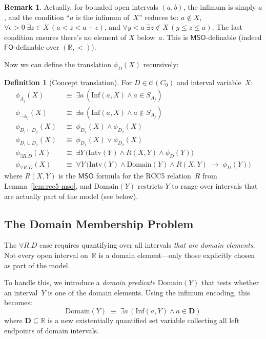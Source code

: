 \documentclass[a4paper,11pt]{article}
\theoremstyle{definition}
\newtheorem{definition}[theorem]{Definition}
\newtheorem{remark}[theorem]{Remark}
\newcommand{\cl}{\ensuremath{\mathsf{cl}}}
\newcommand{\MSO}{\ensuremath{\mathsf{MSO}}}
\newcommand{\FO}{\ensuremath{\mathsf{FO}}}
\newcommand{\reals}{\ensuremath{\mathbb{R}}}
\begin{document}
\begin{remark}
Actually, for bounded open intervals $(a,b)$, the infimum is simply
$a$, and the condition ``$a$ is the infimum of~$X$'' reduces to:
$a \notin X$, $\forall \epsilon > 0 \;\exists z \in X\,(a < z < a+\epsilon)$,
and $\forall y < a\;\exists z \notin X\,(y \leq z \leq a)$.
The last condition ensures there's no element of $X$ below~$a$.
This is $\MSO$-definable (indeed $\FO$-definable over $(\reals, <)$).
\end{remark}

Now we can define the translation $\phi_D(X)$ recursively:

\begin{definition}[Concept translation]
\label{def:translation}
For $D \in \cl(C_0)$ and interval variable~$X$:
\begin{align*}
  \phi_{A_j}(X) &\;\equiv\; \exists a\,(\mathrm{Inf}(a, X) \land
    a \in S_{A_j}) \\
  \phi_{\neg A_j}(X) &\;\equiv\; \exists a\,(\mathrm{Inf}(a, X) \land
    a \notin S_{A_j}) \\
  \phi_{D_1 \sqcap D_2}(X) &\;\equiv\; \phi_{D_1}(X) \land
    \phi_{D_2}(X) \\
  \phi_{D_1 \sqcup D_2}(X) &\;\equiv\; \phi_{D_1}(X) \lor
    \phi_{D_2}(X) \\
  \phi_{\exists R.D}(X) &\;\equiv\; \exists Y\,\bigl(\mathrm{Intv}(Y)
    \land R(X, Y) \land \phi_D(Y)\bigr) \\
  \phi_{\forall R.D}(X) &\;\equiv\; \forall Y\,\bigl(\mathrm{Intv}(Y)
    \land \mathrm{Domain}(Y)
    \land R(X, Y) \;\to\; \phi_D(Y)\bigr)
\end{align*}
where $R(X, Y)$ is the $\MSO$ formula for the RCC5 relation~$R$
from Lemma~\ref{lem:rcc5-mso}, and $\mathrm{Domain}(Y)$ restricts
$Y$ to range over intervals that are actually part of the model
\textup{(}see below\textup{)}.
\end{definition}

\subsection{The Domain Membership Problem}
\label{sec:domain}

The $\forall R.D$ case requires quantifying over all intervals
\emph{that are domain elements}.  Not every open interval on~$\reals$
is a domain element---only those explicitly chosen as part of the
model.

To handle this, we introduce a \emph{domain predicate}
$\mathrm{Domain}(Y)$ that tests whether an interval~$Y$ is one of
the domain elements.  Using the infimum encoding, this becomes:
\[
  \mathrm{Domain}(Y) \;\equiv\; \exists a\,(\mathrm{Inf}(a, Y)
  \land a \in \mathbf{D})
\]
where $\mathbf{D} \subseteq \reals$ is a new existentially
quantified set variable collecting all left endpoints of domain
intervals.
\end{document}
